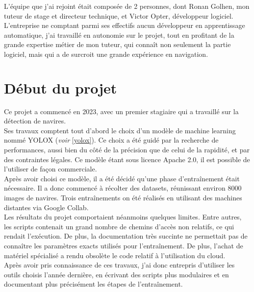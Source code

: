 L'équipe que j'ai rejoint était composée de 2 personnes, dont Ronan Golhen, mon tuteur de stage et
directeur technique, et Victor Opter, développeur logiciel. L'entreprise ne comptant parmi
ses effectifs aucun développeur en apprentissage automatique, j'ai travaillé en autonomie sur le projet,
tout en profitant de la grande expertise métier de mon tuteur, qui connaît non seulement
la partie logiciel, mais qui a de surcroit une grande expérience en navigation. \\

\section{Début du projet}

Ce projet a commencé en 2023, avec un premier stagiaire qui a travaillé sur la détection de navires. \\

Ses travaux comptent tout d'abord le choix d'un modèle de machine learning nommé YOLOX
(\textit{voir }\ref{yolox}).
Ce choix a été guidé par la recherche de performances, aussi bien du côté de la précision
que de celui de la rapidité, et par des contraintes légales. Ce modèle étant sous
licence Apache 2.0, il est possible de l'utiliser de façon commerciale.\\

Après avoir choisi ce modèle, il a été décidé qu'une phase d'entraînement était nécessaire.
Il a donc commencé à récolter des datasets, réunissant environ 8000 images de navires.
Trois entraînements on été réalisés en utilisant des machines distantes via Google Collab. \\

Les résultats du projet comportaient néanmoins quelques limites. Entre autres, les scripts
contenait un grand nombre de chemins d'accès non relatifs, ce qui rendait
l'exécution. De plus, la documentation très succinte ne permettait pas
de connaître les paramètres exacts utilisés pour l'entraînement. De plus, l'achat de matériel
spécialisé a rendu obsolète le code relatif à l'utilisation du cloud.\\

Après avoir pris connaissance de ces travaux, j'ai donc entrepris d'utiliser les outils choisis
l'année dernière, en écrivant des scripts plus modulaires et en documentant plus précisément
les étapes de l'entraînement.
